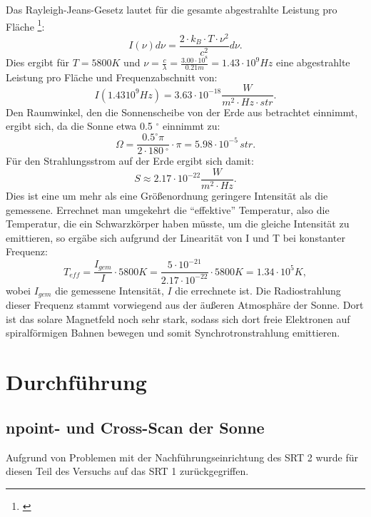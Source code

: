 Das Rayleigh-Jeans-Gesetz lautet für die gesamte abgestrahlte Leistung pro Fläche \footnote{\cite{Ray}}: 
\begin{equation}
I(\nu) d\nu = \frac{2 \cdot k_B \cdot T \cdot \nu^2}{c^2} d\nu. 
\end{equation}
Dies ergibt für $ T = 5800 K$ und $\nu = \frac{c}{\lambda} = \frac{3.00\cdot 10^8}{0.21 m} = 1.43 \cdot 10^9 Hz$ eine abgestrahlte Leistung pro Fläche und Frequenzabschnitt von: 
\begin{equation}
I(1.43 10^{9} Hz) = 3.63 \cdot 10^{-18} \frac{W}{m^2 \cdot Hz \cdot str}.
\end{equation}
Den Raumwinkel, den die Sonnenscheibe von der Erde aus betrachtet einnimmt, ergibt sich, da die Sonne etwa 0.5 $^\circ$ einnimmt zu:
\begin{equation}
\Omega = \frac{0.5 ^\circ \pi}{2 \cdot 180\ ^\circ} \cdot \pi = 5.98 \cdot 10^{-5} \, str. 
\end{equation}
Für den Strahlungsstrom auf der Erde ergibt sich damit: 
\begin{equation}
S \approx 2.17 \cdot 10^{-22} \frac{W}{m^2 \cdot  Hz}.
\end{equation}
Dies ist eine um mehr als eine Größenordnung geringere Intensität als die gemessene. 
Errechnet man umgekehrt die \enquote{effektive} Temperatur, also die Temperatur, die ein Schwarzkörper haben müsste, um die gleiche Intensität zu emittieren, so ergäbe sich aufgrund der Linearität von I und T bei konstanter Frequenz: 
\begin{equation}
T_{eff} = \frac{I_{gem}}{I} \cdot 5800 K = \frac{5 \cdot 10^{-21}}{2.17 \cdot 10^{-22}} \cdot 5800 K = 1.34 \cdot 10^5 K,
\end{equation}
wobei $I_{gem}$ die gemessene Intensität, $I$ die errechnete ist. 
Die Radiostrahlung dieser Frequenz stammt vorwiegend aus der äußeren Atmosphäre der Sonne. Dort ist das solare Magnetfeld noch sehr stark, sodass sich dort freie Elektronen auf spiralförmigen Bahnen bewegen und somit Synchrotronstrahlung emittieren. 

\section{Durchführung}
\subsection{npoint- und Cross-Scan der Sonne}
Aufgrund von Problemen mit der Nachführungseinrichtung des SRT 2 wurde für diesen Teil des Versuchs auf das SRT 1 zurückgegriffen.


